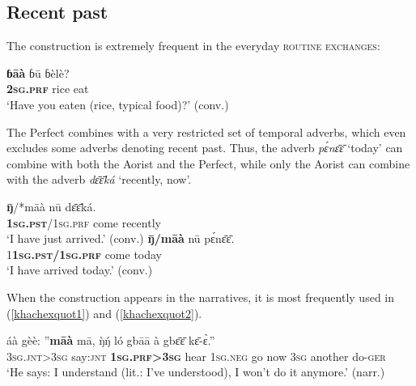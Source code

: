 \documentclass[output=paper,newtxmath,modfonts,nonflat,hidelinks]{langsci/langscibook}
\begin{document}
\subsection{Recent past}

The  construction is extremely frequent in the everyday \textsc{routine exchanges}:

\begin{exe} \ex
\gll	\textbf{ɓāà}	ɓū	ɓèlè?					\\
	\textbf{2\textsc{sg}.\textsc{prf}}	rice	eat					\\
\glt ‘Have you eaten (rice, typical food)?’ (conv.)
\end{exe}

The Perfect combines with a very restricted set of temporal adverbs, which even excludes some adverbs denoting recent past. Thus, the adverb \textit{pɛ́nɛ̄ɛ̄} `today' can combine with both the Aorist and the Perfect, while only the Aorist can combine with the adverb \textit{dɛ̄ɛ̄ká} ‘recently, now’.

\begin{exe} \ex
\begin{xlist} \ex
\label{khachexdeeka}
\gll	\textbf{ŋ̄}/*māà	nū	dɛ̄ɛ̄ká.	\\
		\textbf{1\textsc{sg}.\textsc{pst}}/1\textsc{sg}.\textsc{prf}	come	recently	\\
\glt ‘I have just arrived.’ (conv.)
\ex
\label{khachexpenee}
\gll \textbf{ŋ̄/māà}	nū	pɛ́nɛ̄ɛ̄.		\\
		1\textbf{1\textsc{sg}.\textsc{pst}/1\textsc{sg}.\textsc{prf}}	come	today \\	
\glt ‘I have arrived today.’ (conv.)
\end{xlist}
\end{exe}

When the  construction appears in the narratives, it is most frequently used in  (\ref{khachexquot1}) and  (\ref{khachexquot2}).

\begin{exe} \ex
\label{khachexquot1}
\gll	áà	gèè:	”\textbf{māà}	mā,	ŋ̀ŋ́	ló	gbāā à	gbɛ̄ɛ̄	kɛ̄-ɛ̀.”\\
3\textsc{sg}.\textsc{jnt}>3\textsc{sg}	say:\textsc{jnt}	\textbf{1\textsc{sg}.\textsc{prf}>3\textsc{sg}}	hear	1\textsc{sg}.\textsc{neg}	go	now 3\textsc{sg}	another	    do-\textsc{ger}\\
\glt ‘He says: I understand (lit.: I've understood), I won’t do it anymore.’ (narr.)
\end{exe}
\end{document}
